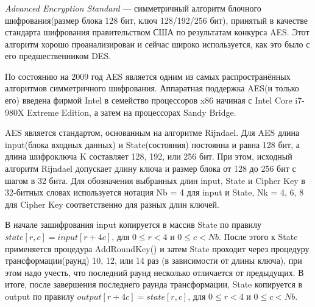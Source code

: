 \subsubsection{}
\label{sec:analysis:research:crypto:aes}

\emph{Advanced Encryption Standard} --- симметричный алгоритм блочного шифрования(размер блока 128 бит, ключ 128/192/256 бит), принятый в качестве стандарта шифрования правительством США по результатам конкурса AES. Этот алгоритм хорошо проанализирован и сейчас широко используется, как это было с его предшественником DES. \cite{wiki:aes}

По состоянию на 2009 год AES является одним из самых распространённых алгоритмов симметричного шифрования. \cite{thg:aes} Аппаратная поддержка AES(и только его) введена фирмой Intel в семейство процессоров x86 начиная с Intel Core i7-980X Extreme Edition, а затем на процессорах Sandy Bridge.

AES является стандартом, основанным на алгоритме Rijndael. Для AES длина input(блока входных данных) и State(состояния) постоянна и равна 128 бит, а длина шифроключа K составляет 128, 192, или 256 бит. При этом, исходный алгоритм Rijndael допускает длину ключа и размер блока от 128 до 256 бит с шагом в 32 бита. Для обозначения выбранных длин input, State и Cipher Key в 32-битных словах используется нотация Nb = 4 для input и State, Nk = 4, 6, 8 для Cipher Key соответственно для разных длин ключей.

В начале зашифрования input копируется в массив State по правилу \(state[r,c]=input[r+4c]\), для \(0 \leq r < 4\) и \(0 \leq c < Nb\). После этого к State применяется процедура AddRoundKey() и затем State проходит через процедуру трансформации(раунд) 10, 12, или 14 раз (в зависимости от длины ключа), при этом надо учесть, что последний раунд несколько отличается от предыдущих. В итоге, после завершения последнего раунда трансформации, State копируется в output по правилу \(output[r+4c]=state[r,c]\), для \(0 \leq r < 4\) и \(0 \leq c < Nb\).
